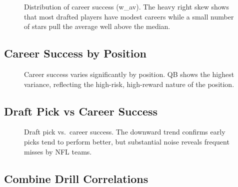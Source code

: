 \documentclass[11pt]{article}
\begin{document}
\begin{figure}[H]
  \centering
  \caption{Distribution of career success (w\_av). The heavy right skew shows that most drafted players have modest careers while a small number of stars pull the average well above the median.}
  \label{fig:wav_dist}
\end{figure}

\subsection{Career Success by Position}


\begin{figure}[H]
  \centering
  \caption{Career success varies significantly by position. QB shows the highest variance, reflecting the high-risk, high-reward nature of the position.}
  \label{fig:wav_position}
\end{figure}

\subsection{Draft Pick vs Career Success}


\begin{figure}[H]
  \centering
  \caption{Draft pick vs.\ career success. The downward trend confirms early picks tend to perform better, but substantial noise reveals frequent misses by NFL teams.}
  \label{fig:pick_wav}
\end{figure}

\subsection{Combine Drill Correlations}
\end{document}
